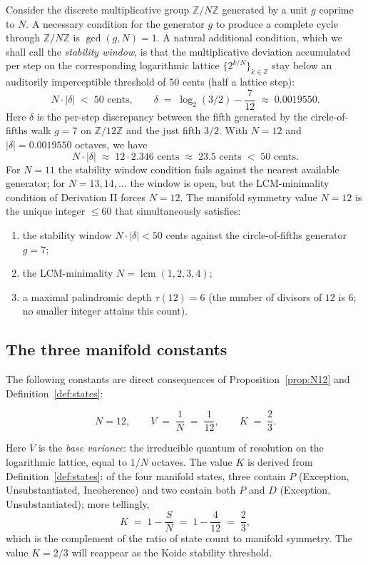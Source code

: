 \documentclass[11pt,a4paper]{article}
\theoremstyle{definition}
\theoremstyle{remark}
\newcommand{\Z}{\mathbb{Z}}
\DeclareMathOperator{\lcm}{lcm}
\begin{document}
Consider the discrete multiplicative group $\Z/N\Z$ generated by a unit $g$ coprime to $N$. A necessary condition for the generator $g$ to produce a complete cycle through $\Z/N\Z$ is $\gcd(g,N)=1$. A natural additional condition, which we shall call the \emph{stability window}, is that the multiplicative deviation accumulated per step on the corresponding logarithmic lattice $\{2^{k/N}\}_{k\in\Z}$ stay below an auditorily imperceptible threshold of $50$ cents (half a lattice step):
\[
N\cdot|\delta| \;<\; 50 \text{ cents}, \qquad \delta \;=\; \log_{2}(3/2) - \frac{7}{12} \;\approx\; 0.0019550.
\]
Here $\delta$ is the per-step discrepancy between the fifth generated by the circle-of-fifths walk $g=7$ on $\Z/12\Z$ and the just fifth $3/2$. With $N=12$ and $|\delta| = 0.0019550$ octaves, we have
\[
N\cdot|\delta| \;\approx\; 12\cdot 2.346\text{ cents} \;\approx\; 23.5 \text{ cents} \;<\; 50 \text{ cents}.
\]
For $N=11$ the stability window condition fails against the nearest available generator; for $N=13,14,\ldots$ the window is open, but the LCM-minimality condition of Derivation II forces $N=12$. The manifold symmetry value $N=12$ is the unique integer $\le 60$ that simultaneously satisfies:
\begin{enumerate}[leftmargin=*,label=(\roman*)]
\item the stability window $N\cdot|\delta|<50$ cents against the circle-of-fifths generator $g=7$;
\item the LCM-minimality $N=\lcm(1,2,3,4)$;
\item a maximal palindromic depth $\tau(12)=6$ (the number of divisors of $12$ is $6$; no smaller integer attains this count).
\end{enumerate}

\subsection{The three manifold constants}

The following constants are direct consequences of Proposition~\ref{prop:N12} and Definition~\ref{def:states}:

\begin{equation}\label{eq:constants}
\boxed{\;N = 12, \qquad V \;=\; \frac{1}{N} \;=\; \frac{1}{12}, \qquad K \;=\; \frac{2}{3}.\;}
\end{equation}

Here $V$ is the \emph{base variance}: the irreducible quantum of resolution on the logarithmic lattice, equal to $1/N$ octaves. The value $K$ is derived from Definition~\ref{def:states}: of the four manifold states, three contain $P$ (Exception, Unsubstantiated, Incoherence) and two contain both $P$ and $D$ (Exception, Unsubstantiated); more tellingly,
\[
K \;=\; 1 - \frac{S}{N} \;=\; 1 - \frac{4}{12} \;=\; \frac{2}{3},
\]
which is the complement of the ratio of state count to manifold symmetry. The value $K=2/3$ will reappear as the Koide stability threshold.
\end{document}

